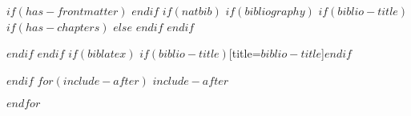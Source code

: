 \documentclass[
$if(fontsize)$
  $fontsize$,
$endif$
$if(papersize)$
  $papersize$paper,
$endif$
$for(classoption)$
  $classoption$$sep$,
$endfor$
]{book}
\theoremstyle{nonumberplain}
\begin{document}
$if(has-frontmatter)$
\backmatter
$endif$
$if(natbib)$
$if(bibliography)$
$if(biblio-title)$
$if(has-chapters)$
\renewcommand\bibname{$biblio-title$}
$else$
\renewcommand\refname{$biblio-title$}
$endif$
$endif$
  

$endif$
$endif$
$if(biblatex)$
\printbibliography$if(biblio-title)$[title=$biblio-title$]$endif$

$endif$
$for(include-after)$
$include-after$

$endfor$
\end{document}
